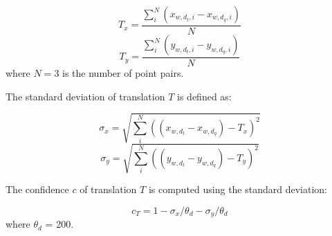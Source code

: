 \begin{equation}
T_x = \frac{\sum_{i}^{N} (x_{w, d_t, i} - x_{w, d_q, i})}{N}
\end{equation}
\begin{equation}
T_y = \frac{\sum_{i}^{N} (y_{w, d_t ,i} - y_{w, d_q, i})}{N}
\end{equation}
where $N = 3$ is the number of point pairs.

The standard deviation of translation  $T$ is defined as:

\begin{equation}
\sigma_x = \sqrt{  \sum_{i}^{N}   ((x_{w, d_t} - x_{w, d_q}) - T_x)^{2}   }
\end{equation}
\begin{equation}
\sigma_y = \sqrt{  \sum_{i}^{N}   ((y_{w, d_t} - y_{w, d_q}) - T_y)^{2}   }
\end{equation}

The confidence $c$ of translation $T$ is computed using the standard deviation:

\begin{equation}
c_{T} = 1 -   \sigma_x / \theta_{d} -  \sigma_y / \theta_{d}
\end{equation}
where $\theta_d$ = 200.

